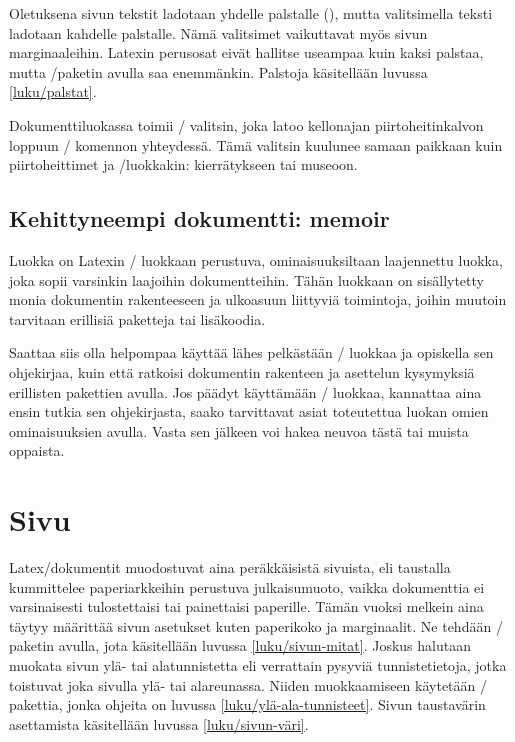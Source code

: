 Oletuksena sivun tekstit ladotaan yhdelle palstalle
(), mutta valitsimella  teksti
ladotaan kahdelle palstalle. Nämä valitsimet vaikuttavat myös sivun
marginaaleihin. Latexin perusosat eivät hallitse useampaa kuin kaksi
palstaa, mutta \-/paketin avulla saa enemmänkin.
Palstoja käsitellään luvussa \ref{luku/palstat}.

Dokumenttiluokassa  toimii \-/ valitsin,
joka latoo kellonajan piirtoheitinkalvon loppuun \-/
komennon yhteydessä. Tämä valitsin kuulunee samaan paikkaan kuin
piirtoheittimet ja \-/luokkakin: kierrätykseen tai
museoon.

\subsection{Kehittyneempi dokumentti: memoir}

Luokka  on Latexin \-/ luokkaan
perustuva, ominaisuuksiltaan laajennettu luokka, joka sopii varsinkin
laajoihin dokumentteihin. Tähän luokkaan on sisällytetty monia
dokumentin rakenteeseen ja ulkoasuun liittyviä toimintoja, joihin
muutoin tarvitaan erillisiä paketteja tai lisäkoodia.

Saattaa siis olla helpompaa käyttää lähes pelkästään \-/
luokkaa ja opiskella sen ohjekirjaa, kuin että ratkoisi dokumentin
rakenteen ja asettelun kysymyksiä erillisten pakettien avulla. Jos
päädyt käyttämään \-/ luokkaa, kannattaa aina ensin
tutkia sen ohjekirjasta, saako tarvittavat asiat toteutettua luokan
omien ominaisuuksien avulla. Vasta sen jälkeen voi hakea neuvoa tästä
tai muista oppaista.

\section{Sivu}
\label{luku/sivuasetukset}

Latex\-/dokumentit muodostuvat aina peräkkäisistä sivuista, eli
taustalla kummittelee paperiarkkeihin perustuva julkaisumuoto, vaikka
dokumenttia ei varsinaisesti tulostettaisi tai painettaisi paperille.
Tämän vuoksi melkein aina täytyy määrittää sivun asetukset kuten
paperikoko ja marginaalit. Ne tehdään \-/ paketin
avulla, jota käsitellään luvussa \ref{luku/sivun-mitat}. Joskus halutaan
muokata sivun ylä- tai alatunnistetta eli verrattain pysyviä
tunnistetietoja, jotka toistuvat joka sivulla ylä- tai alareunassa.
Niiden muokkaamiseen käytetään \-/ pakettia, jonka
ohjeita on luvussa \ref{luku/ylä-ala-tunnisteet}. Sivun taustavärin
asettamista käsitellään luvussa \ref{luku/sivun-väri}.

